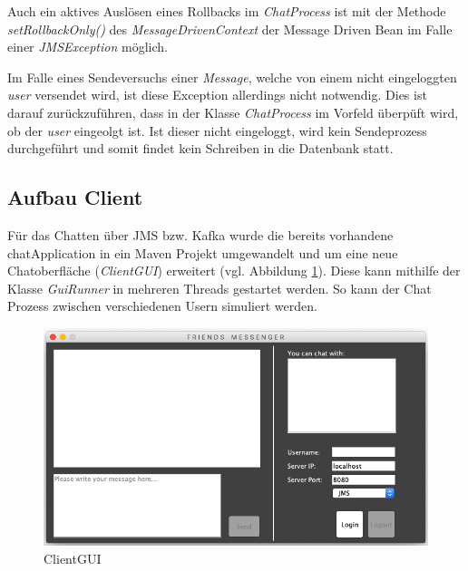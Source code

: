 \documentclass[10pt,journal,compsoc]{IEEEtran}
\begin{document}
Auch ein aktives Auslösen eines Rollbacks im \textit{ChatProcess} ist mit der Methode \textit{setRollbackOnly()} des \textit{MessageDrivenContext} der Message Driven Bean im Falle einer \textit{JMSException} möglich. 

Im Falle eines Sendeversuchs einer \textit{Message}, welche von einem nicht eingeloggten \textit{user} versendet wird, ist diese Exception allerdings nicht notwendig. Dies ist darauf zurückzuführen, dass in der Klasse \textit{ChatProcess} im Vorfeld überpüft wird, ob der \textit{user} eingeolgt ist. Ist dieser nicht eingeloggt, wird kein Sendeprozess durchgeführt und somit findet kein Schreiben in die Datenbank statt. 

\subsection{Aufbau Client}
Für das Chatten über JMS bzw. Kafka wurde die bereits vorhandene chatApplication in ein Maven Projekt umgewandelt und um eine neue Chatoberfläche ({\textit{ClientGUI}}) erweitert (vgl. Abbildung \ref{fig:clientGUI}). Diese kann mithilfe der Klasse {\textit{GuiRunner}} in mehreren Threads gestartet werden. So kann der Chat Prozess zwischen verschiedenen Usern simuliert werden.

\begin{figure}[h]
	\centering
	\includegraphics[scale=0.3]{Bilder/ClientGUI.PNG}
	\caption{ClientGUI}
	\label{fig:clientGUI}
\end{figure}
\end{document}
